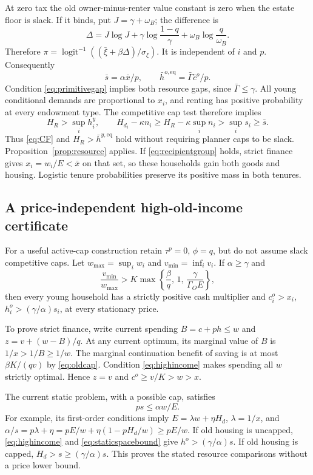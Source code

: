 \documentclass[11pt]{article}
\newcommand{\eq}{\mathrm{eq}}
\newcommand{\logit}{\operatorname{logit}^{-1}}
\begin{document}
At zero tax the old owner-minus-renter value constant is zero when the estate floor is slack. If it binds, put $J=\gamma+\omega_B$; the difference is
\begin{equation}
 \Delta=J\log J+\gamma\log\frac{1-q}{\gamma}
                  +\omega_B\log\frac q{\omega_B}.\label{eq:tenuredifference}
\end{equation}
Therefore $\pi=\logit((\bar\xi+\beta\Delta)/\sigma_\xi)$. It is independent of $i$ and $p$. Consequently
\[
 \bar s=\alpha\bar x/p,\qquad
 \bar h^{o,\eq}=\bar\Gamma\bar c^o/p.
\]
Condition \eqref{eq:primitivegap} implies both resource gaps, since $\bar\Gamma\le\gamma$. All young conditional demands are proportional to $x_i$, and renting has positive probability at every endowment type. The competitive cap test therefore implies
\[
 H_R>\sup_i h_i^y,\qquad
 H_{d_i}-\kappa n_i\ge H_R-\kappa\sup_i n_i
 >\sup_i s_i\ge\bar s.
\]
Thus \eqref{eq:CF} and $H_R>\bar h^{y,\eq}$ hold without requiring planner caps to be slack. Proposition~\ref{prop:resource} applies. If \eqref{eq:recipientgroup} holds, strict finance gives $x_i=w_i/E<\bar x$ on that set, so these households gain both goods and housing. Logistic tenure probabilities preserve its positive mass in both tenures.

\subsection{A price-independent high-old-income certificate}
For a useful active-cap construction retain $\tau^p=0$, $\phi=q$, but do not assume slack competitive caps. Let $w_{\max}=\sup_i w_i$ and $v_{\min}=\inf_i v_i$. If $\alpha\ge\gamma$ and
\begin{equation}
 \frac{v_{\min}}{w_{\max}}
 >K\max\left\{\frac\beta q,\,1,\,\frac\gamma{\Gamma_OE}\right\},\label{eq:highincome}
\end{equation}
then every young household has a strictly positive cash multiplier and
$c_i^o>x_i$, $h_i^o>(\gamma/\alpha)s_i$, at every stationary price.

To prove strict finance, write current spending $B=c+ph\le w$ and $z=v+(w-B)/q$. At any current optimum, its marginal value of $B$ is $1/x>1/B\ge1/w$. The marginal continuation benefit of saving is at most $\beta K/(qv)$ by \eqref{eq:oldcap}. Condition \eqref{eq:highincome} makes spending all $w$ strictly optimal. Hence $z=v$ and $c^o\ge v/K>w>x$.

The current static problem, with a possible cap, satisfies
\begin{equation}
 ps\le\alpha w/E.\label{eq:staticspacebound}
\end{equation}
For example, its first-order conditions imply
$E=\lambda w+\eta H_d$, $\lambda=1/x$, and
$\alpha/s=p\lambda+\eta=pE/w+\eta(1-pH_d/w)\ge pE/w$.
If old housing is uncapped, \eqref{eq:highincome} and \eqref{eq:staticspacebound} give $h^o>(\gamma/\alpha)s$. If old housing is capped, $H_d>s\ge(\gamma/\alpha)s$. This proves the stated resource comparisons without a price lower bound.
\end{document}

